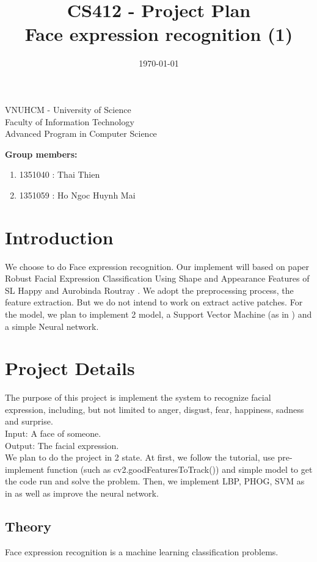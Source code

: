 \documentclass[a4paper, 12pt]{article}
\title{CS412 - Project Plan\\ Face expression recognition (1)}
\date{\today}
\begin{document}
\begin{center} 
\large VNUHCM - University of Science\\
Faculty of Information Technology\\
Advanced Program in Computer Science
\end{center}

\begingroup
\let\newpage\relax
\maketitle
\endgroup

\textbf{Group members:}
\begin{enumerate}
	\item 1351040 : Thai Thien
	\item 1351059 : Ho Ngoc Huynh Mai
\end{enumerate}

\section{Introduction}

We choose to do Face expression recognition. Our implement will based on paper Robust Facial Expression Classification Using Shape and Appearance Features of SL Happy and Aurobinda Routray \cite{7050661}. We adopt the preprocessing process, the feature extraction. But we do not intend to work on extract active patches. For the model, we plan to implement 2 model, a Support Vector Machine (as in \cite{7050661}) and a simple Neural network.      

\section{Project Details}
The purpose of this project is implement the system to recognize facial expression, including, but not limited to anger, disgust, fear, happiness, sadness and surprise. \\
Input: A face of someone. \\
Output: The facial expression. \\ 

We plan to do the project in 2 state. At first, we follow the tutorial, use pre-implement function (such as cv2.goodFeaturesToTrack()) and simple model to get the code run and solve the problem. Then, we implement LBP, PHOG, SVM as in \cite{7050661} as well as improve the neural network.
\subsection{Theory}
Face expression recognition is a machine learning classification problems.   
\end{document}
